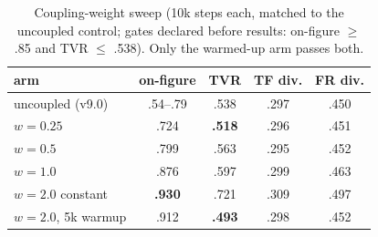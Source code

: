 \documentclass[10pt,twocolumn]{article}
\begin{document}
\begin{table}[t]\centering\caption{Coupling-weight sweep (10k steps each, matched to the uncoupled control; gates
declared before results: on-figure $\ge$ .85 and TVR $\le$ .538). Only the warmed-up arm passes both.}
\label{tab:coupling}\scriptsize
\setlength{\tabcolsep}{4pt}
\begin{tabular}{@{}lcccc@{}}
\toprule
arm & on-figure & TVR & TF div. & FR div. \\
\midrule
uncoupled (v9.0) & .54--.79 & .538 & .297 & .450 \\
$w{=}0.25$ & .724 & \textbf{.518} & .296 & .451 \\
$w{=}0.5$ & .799 & .563 & .295 & .452 \\
$w{=}1.0$ & .876 & .597 & .299 & .463 \\
$w{=}2.0$ constant & \textbf{.930} & .721 & .309 & .497 \\
$w{=}2.0$, 5k warmup & .912 & \textbf{.493} & .298 & .452 \\
\bottomrule
\end{tabular}
\end{table}
\end{document}
